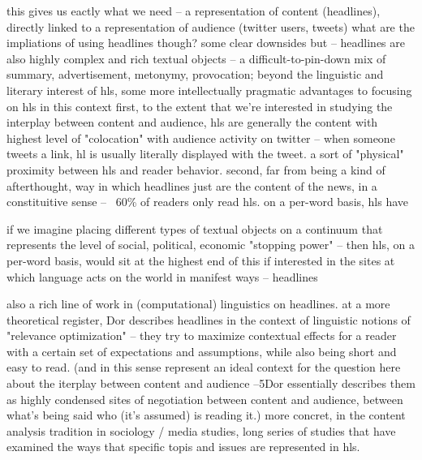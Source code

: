 \documentclass{scrartcl}
\begin{document}
this gives us eactly what we need -- a representation of content (headlines), directly linked to a representation of audience (twitter users, tweets)
what are the impliations of using headlines though?
some clear downsides
but -- headlines are also highly complex and rich textual objects -- a difficult-to-pin-down mix of summary, advertisement, metonymy, provocation; beyond the linguistic and literary interest of hls, some more intellectually pragmatic advantages to focusing on hls in this context
first, to the extent that we're interested in studying the interplay between content and audience, hls are generally the content with highest level of "colocation" with audience activity on twitter -- when someone tweets a link, hl is usually literally displayed with the tweet. a sort of "physical" proximity between hls and reader behavior.
second, far from being a kind of afterthought, way in which headlines just are the content of the news, in a constituitive sense -- ~60\% of readers only read hls. on a per-word basis, hls have

if we imagine placing different types of textual objects on a continuum that represents the level of social, political, economic "stopping power" -- then hls, on a per-word basis, would sit at the highest end of this
if interested in the sites at which language acts on the world in manifest ways -- headlines

also a rich line of work in (computational) linguistics on headlines. at a more theoretical register, Dor describes headlines in the context of linguistic notions of "relevance optimization" -- they try to maximize contextual effects for a reader with a certain set of expectations and assumptions, while also being short and easy to read. (and in this sense represent an ideal context for the question here about the iterplay between content and audience --5Dor essentially describes them as highly condensed sites of negotiation between content and audience, between what's being said who (it's assumed) is reading it.)
more concret, in the content analysis tradition in sociology / media studies, long series of studies that have examined the ways that specific topis and issues are represented in hls.
\end{document}
